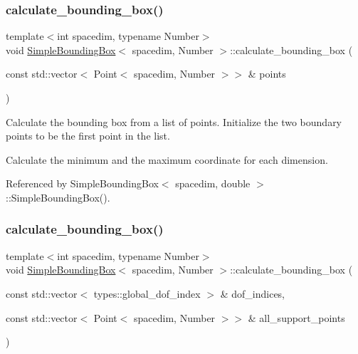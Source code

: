 \subsubsection{\texorpdfstring{calculate\+\_\+bounding\+\_\+box()}{calculate\_bounding\_box()}\hspace{0.1cm}{\footnotesize\ttfamily [1/2]}}
{\footnotesize\ttfamily template$<$int spacedim, typename Number$>$ \\
void \hyperlink{classSimpleBoundingBox}{Simple\+Bounding\+Box}$<$ spacedim, Number $>$\+::calculate\+\_\+bounding\+\_\+box (\begin{DoxyParamCaption}\item[{const std\+::vector$<$ Point$<$ spacedim, Number $>$$>$ \&}]{points }\end{DoxyParamCaption})\hspace{0.3cm}{\ttfamily [private]}}

Calculate the bounding box from a list of points. Initialize the two boundary points to be the first point in the list.

Calculate the minimum and the maximum coordinate for each dimension.

Referenced by Simple\+Bounding\+Box$<$ spacedim, double $>$\+::\+Simple\+Bounding\+Box().

\mbox{\label{classSimpleBoundingBox_aafff59e6c56578638d58ca6095024bac}} 
\subsubsection{\texorpdfstring{calculate\+\_\+bounding\+\_\+box()}{calculate\_bounding\_box()}\hspace{0.1cm}{\footnotesize\ttfamily [2/2]}}
{\footnotesize\ttfamily template$<$int spacedim, typename Number$>$ \\
void \hyperlink{classSimpleBoundingBox}{Simple\+Bounding\+Box}$<$ spacedim, Number $>$\+::calculate\+\_\+bounding\+\_\+box (\begin{DoxyParamCaption}\item[{const std\+::vector$<$ types\+::global\+\_\+dof\+\_\+index $>$ \&}]{dof\+\_\+indices,  }\item[{const std\+::vector$<$ Point$<$ spacedim, Number $>$$>$ \&}]{all\+\_\+support\+\_\+points }\end{DoxyParamCaption})\hspace{0.3cm}{\ttfamily [private]}}

